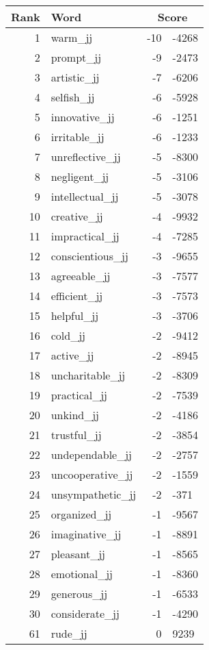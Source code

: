 \begin{longtable}[!htbp]{| rlr@{.}l |}
    \hline
    \textbf{Rank} & \textbf{Word} & \multicolumn{2}{c|}{\textbf{Score}} \\
    \hline
    \endhead
    1 & warm\_jj & -10 & -4268 \\
    2 & prompt\_jj & -9 & -2473 \\
    3 & artistic\_jj & -7 & -6206 \\
    4 & selfish\_jj & -6 & -5928 \\
    5 & innovative\_jj & -6 & -1251 \\
    6 & irritable\_jj & -6 & -1233 \\
    7 & unreflective\_jj & -5 & -8300 \\
    8 & negligent\_jj & -5 & -3106 \\
    9 & intellectual\_jj & -5 & -3078 \\
    10 & creative\_jj & -4 & -9932 \\
    11 & impractical\_jj & -4 & -7285 \\
    12 & conscientious\_jj & -3 & -9655 \\
    13 & agreeable\_jj & -3 & -7577 \\
    14 & efficient\_jj & -3 & -7573 \\
    15 & helpful\_jj & -3 & -3706 \\
    16 & cold\_jj & -2 & -9412 \\
    17 & active\_jj & -2 & -8945 \\
    18 & uncharitable\_jj & -2 & -8309 \\
    19 & practical\_jj & -2 & -7539 \\
    20 & unkind\_jj & -2 & -4186 \\
    21 & trustful\_jj & -2 & -3854 \\
    22 & undependable\_jj & -2 & -2757 \\
    23 & uncooperative\_jj & -2 & -1559 \\
    24 & unsympathetic\_jj & -2 & -371 \\
    25 & organized\_jj & -1 & -9567 \\
    26 & imaginative\_jj & -1 & -8891 \\
    27 & pleasant\_jj & -1 & -8565 \\
    28 & emotional\_jj & -1 & -8360 \\
    29 & generous\_jj & -1 & -6533 \\
    30 & considerate\_jj & -1 & -4290 \\
    61 & rude\_jj & 0 & 9239 \\

\end{longtable}
